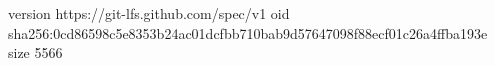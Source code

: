 version https://git-lfs.github.com/spec/v1
oid sha256:0cd86598c5e8353b24ac01dcfbb710bab9d57647098f88ecf01c26a4ffba193e
size 5566
